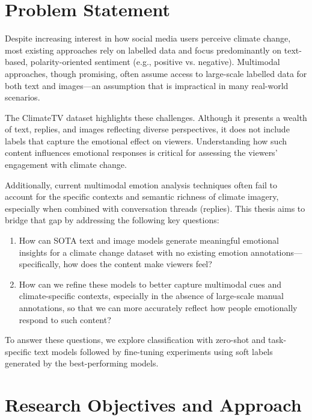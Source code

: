 \section{Problem Statement}

Despite increasing interest in how social media users perceive climate change, most existing approaches rely on labelled data and focus predominantly on text-based, polarity-oriented sentiment (e.g., positive vs. negative). Multimodal approaches, though promising, often assume access to large-scale labelled data for both text and images—an assumption that is impractical in many real-world scenarios.
\newline

The ClimateTV dataset highlights these challenges. Although it presents a wealth of text, replies, and images reflecting diverse perspectives, it does not include labels that capture the emotional effect on viewers. Understanding how such content influences emotional responses is critical for assessing the viewers' engagement with climate change.
\newline

Additionally, current multimodal emotion analysis techniques often fail to account for the specific contexts and semantic richness of climate imagery, especially when combined with conversation threads (replies). This thesis aims to bridge that gap by addressing the following key questions:


\begin{enumerate}
    \item How can SOTA text and image models generate meaningful emotional insights for a climate change dataset with no existing emotion annotations—specifically, how does the content make viewers feel?
    \item How can we refine these models to better capture multimodal cues and climate-specific contexts, especially in the absence of large-scale manual annotations, so that we can more accurately reflect how people emotionally respond to such content?
\end{enumerate}

To answer these questions, we explore classification with zero-shot and task-specific text models followed by fine-tuning experiments using soft labels generated by the best-performing models.

\section{Research Objectives and Approach}

